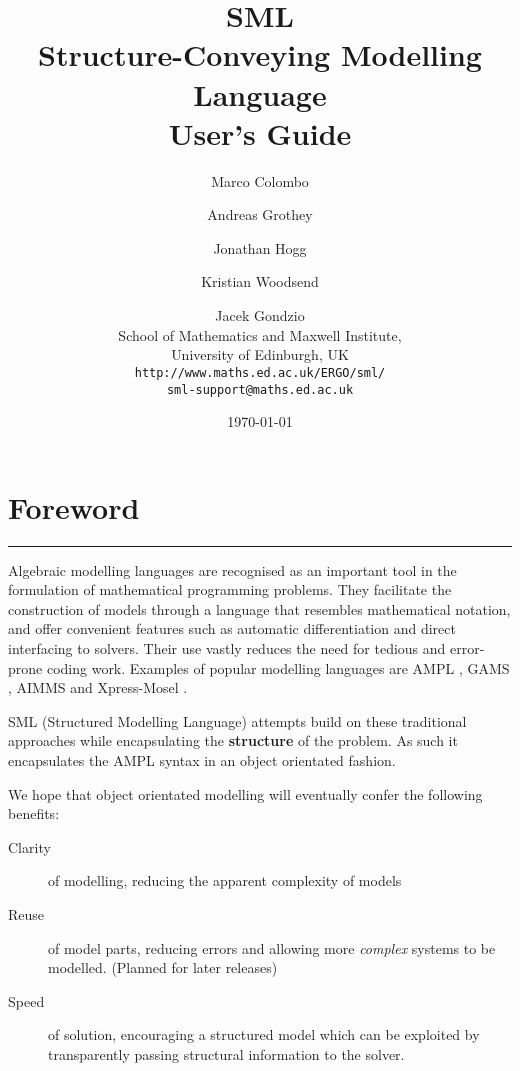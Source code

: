 \documentclass[10pt,a4paper]{book}
\begin{document}
\title{SML \\
   Structure-Conveying Modelling Language \\
   \bf User's Guide}
\author{Marco Colombo
\and Andreas Grothey
\and Jonathan Hogg
\and Kristian Woodsend
\and Jacek Gondzio \\[3ex]
School of Mathematics and Maxwell Institute, \\
University of Edinburgh, UK \\[5ex]
{\tt http://www.maths.ed.ac.uk/ERGO/sml/} \\
{\tt sml-support@maths.ed.ac.uk}
}

\date{\today}

\maketitle

\section*{Foreword}
\vspace{-0.6cm}\rule{\textwidth}{0.4ex}\vspace{0.1cm}
\label{sec:Intro}

Algebraic modelling languages are recognised as an important tool in the
formulation of mathematical programming problems. They facilitate the
construction of models through a language that resembles mathematical
notation, and offer convenient features such as automatic differentiation and
direct interfacing to solvers. Their use vastly reduces the need for tedious
and error-prone coding work. Examples of popular modelling languages
are AMPL \cite{mybib:AMPL}, GAMS \cite{mybib:GAMS}, AIMMS \cite{mybib:AIMMS}
and Xpress-Mosel \cite{mybib:Mosel}.

SML (Structured Modelling Language) attempts build on these traditional
approaches while encapsulating the {\bf structure} of the problem. As such
it encapsulates the AMPL syntax in an object orientated fashion.

We hope that object orientated modelling will eventually confer the following benefits:
\begin{description}
   \item[Clarity] of modelling, reducing the apparent complexity of models
   \item[Reuse] of model parts, reducing errors and allowing more {\it complex}
      systems to be modelled. (Planned for later releases)
   \item[Speed] of solution, encouraging a structured model which can be
      exploited by transparently passing structural information to the solver.
\end{description}
\end{document}
